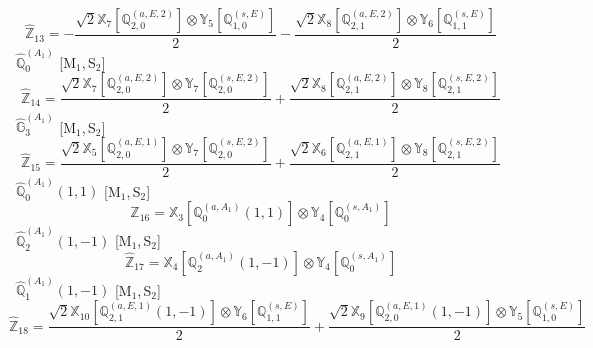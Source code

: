 \documentclass[fleqn,10pt,landscape]{article}
\begin{document}
\begin{itemize}
\begin{dmath*}
\hat{\mathbb{Z}}_{13}=- \frac{\sqrt{2} \mathbb{X}_{7}[\mathbb{Q}_{2,0}^{(a,E,2)}] \otimes\mathbb{Y}_{5}[\mathbb{Q}_{1,0}^{(s,E)}]}{2} - \frac{\sqrt{2} \mathbb{X}_{8}[\mathbb{Q}_{2,1}^{(a,E,2)}] \otimes\mathbb{Y}_{6}[\mathbb{Q}_{1,1}^{(s,E)}]}{2}
\end{dmath*}
\vspace{4mm}
\noindent {} $\,\,\,\hat{\mathbb{Q}}_{0}^{(A_{1})}$ [M$_{1}$,\,S$_{2}$]
\begin{dmath*}
\hat{\mathbb{Z}}_{14}=\frac{\sqrt{2} \mathbb{X}_{7}[\mathbb{Q}_{2,0}^{(a,E,2)}] \otimes\mathbb{Y}_{7}[\mathbb{Q}_{2,0}^{(s,E,2)}]}{2} + \frac{\sqrt{2} \mathbb{X}_{8}[\mathbb{Q}_{2,1}^{(a,E,2)}] \otimes\mathbb{Y}_{8}[\mathbb{Q}_{2,1}^{(s,E,2)}]}{2}
\end{dmath*}
\vspace{4mm}
\noindent {} $\,\,\,\hat{\mathbb{G}}_{3}^{(A_{1})}$ [M$_{1}$,\,S$_{2}$]
\begin{dmath*}
\hat{\mathbb{Z}}_{15}=\frac{\sqrt{2} \mathbb{X}_{5}[\mathbb{Q}_{2,0}^{(a,E,1)}] \otimes\mathbb{Y}_{7}[\mathbb{Q}_{2,0}^{(s,E,2)}]}{2} + \frac{\sqrt{2} \mathbb{X}_{6}[\mathbb{Q}_{2,1}^{(a,E,1)}] \otimes\mathbb{Y}_{8}[\mathbb{Q}_{2,1}^{(s,E,2)}]}{2}
\end{dmath*}
\vspace{4mm}
\noindent {} $\,\,\,\hat{\mathbb{Q}}_{0}^{(A_{1})}(1,1)$ [M$_{1}$,\,S$_{2}$]
\begin{dmath*}
\hat{\mathbb{Z}}_{16}=\mathbb{X}_{3}[\mathbb{Q}_{0}^{(a,A_{1})}(1,1)] \otimes\mathbb{Y}_{4}[\mathbb{Q}_{0}^{(s,A_{1})}]
\end{dmath*}
\vspace{4mm}
\noindent {} $\,\,\,\hat{\mathbb{Q}}_{2}^{(A_{1})}(1,-1)$ [M$_{1}$,\,S$_{2}$]
\begin{dmath*}
\hat{\mathbb{Z}}_{17}=\mathbb{X}_{4}[\mathbb{Q}_{2}^{(a,A_{1})}(1,-1)] \otimes\mathbb{Y}_{4}[\mathbb{Q}_{0}^{(s,A_{1})}]
\end{dmath*}
\vspace{4mm}
\noindent {} $\,\,\,\hat{\mathbb{Q}}_{1}^{(A_{1})}(1,-1)$ [M$_{1}$,\,S$_{2}$]
\begin{dmath*}
\hat{\mathbb{Z}}_{18}=\frac{\sqrt{2} \mathbb{X}_{10}[\mathbb{Q}_{2,1}^{(a,E,1)}(1,-1)] \otimes\mathbb{Y}_{6}[\mathbb{Q}_{1,1}^{(s,E)}]}{2} + \frac{\sqrt{2} \mathbb{X}_{9}[\mathbb{Q}_{2,0}^{(a,E,1)}(1,-1)] \otimes\mathbb{Y}_{5}[\mathbb{Q}_{1,0}^{(s,E)}]}{2}
\end{dmath*}
\vspace{4mm}

\end{itemize}
\end{document}
